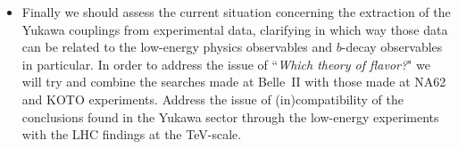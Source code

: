 \begin{itemize}
\item Finally we should assess the current situation concerning the extraction of the Yukawa couplings from experimental data, clarifying in which way those data can be related to the low-energy physics observables and 
$b$-decay observables in particular. In order to address the issue of ``{\it Which theory of flavor?}" we will try and combine the searches made at Belle~II with those made at NA62 and KOTO experiments.  
Address the issue of (in)compatibility of the conclusions found in the Yukawa sector through the low-energy experiments with the LHC findings at the TeV-scale. 
\end{itemize} 

%
%

